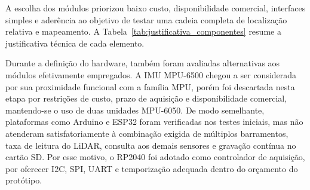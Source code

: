A escolha dos módulos priorizou baixo custo, disponibilidade comercial, interfaces simples e aderência ao objetivo de testar uma cadeia completa de localização relativa e mapeamento. A Tabela~\ref{tab:justificativa_componentes} resume a justificativa técnica de cada elemento.

Durante a definição do hardware, também foram avaliadas alternativas aos módulos efetivamente empregados. A IMU MPU-6500 chegou a ser considerada por sua proximidade funcional com a família MPU, porém foi descartada nesta etapa por restrições de custo, prazo de aquisição e disponibilidade comercial, mantendo-se o uso de duas unidades MPU-6050. De modo semelhante, plataformas como Arduino e ESP32 foram verificadas nos testes iniciais, mas não atenderam satisfatoriamente à combinação exigida de múltiplos barramentos, taxa de leitura do LiDAR, consulta aos demais sensores e gravação contínua no cartão SD. Por esse motivo, o RP2040 foi adotado como controlador de aquisição, por oferecer I2C, SPI, UART e temporização adequada dentro do orçamento do protótipo.

